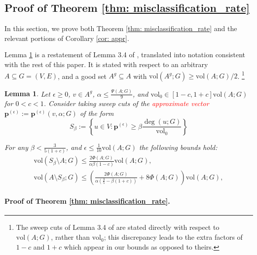\documentclass{article}
\let\pprspace\relax
\newcommand{\vol}{\mathrm{vol}}
\newcommand{\1}{\mathbf{1}}
\newcommand{\pbf}{\mathbf{p}}
\newcommand{\pprspace}{{\sc PPR~}}
\theoremstyle{aldenthm}
\newtheorem{lemma}{Lemma}
\begin{document}
\subsection{Proof of Theorem \ref{thm: misclassification_rate}}
\label{sec: proof_of_misclassification_rate}

In this section, we prove both Theorem \ref{thm: misclassification_rate} and the relevant portions of Corollary \ref{cor: appr}.

Lemma \ref{lem: zhu} is a restatement of Lemma 3.4 of \cite{zhu2013}, translated into notation consistent with the rest of this paper. It is stated with respect to an arbitrary $A \subseteq G = (V,E)$, and a good set $A^g \subseteq A$ with $\vol(A^g; G) \geq \vol(A; G)/2$. \footnote{The sweep cuts of Lemma 3.4 of \cite{zhu2013} are stated directly with respect to $\vol(A;G)$, rather than $\vol_0$; this discrepancy leads to the extra factors of $1 - c$ and $1 + c$ which appear in our bounds as opposed to theirs.}

\begin{lemma}
	\label{lem: zhu}
	Let $\epsilon \geq 0$, $v \in A^g$, $\alpha \leq \frac{\Psi(A; G)}{9}$, and $\vol_0 \in [1 - c,1 + c] \vol(A;G)$ for $0 < c < 1$. Consider taking sweep cuts of the \textcolor{red}{approximate \pprspace vector} $\pbf^{(\epsilon)} := \pbf^{(\epsilon)}(v,\alpha; G)$ of the form
	\begin{equation*}
	S_{\beta} := \left\{u \in V: \pbf^{(\epsilon)} \geq \beta \frac{\deg(u; G)}{\vol_0} \right\}
	\end{equation*}
	
	For any $\beta < \frac{3}{5(1 + c)}$, and $\epsilon \leq \frac{1}{10} \vol(A;G)$ the following bounds hold:
	\begin{align}
	\vol(S_{\beta} \setminus A; G) \leq \frac{2\Phi(A;G)}{\alpha \beta(1 - c)} \vol(A; G), \label{eqn: zhu_1}\\
	\vol(A \setminus S_{\beta}; G) \leq \left(\frac{2\Phi(A;G)}{\alpha (\frac{3}{5} - \beta(1 + c))} + 8\Phi(A;G)\right)\vol(A; G),  \label{eqn: zhu_2}
	\end{align}
\end{lemma}

\paragraph{Proof of Theorem \ref{thm: misclassification_rate}.}
\end{document}
